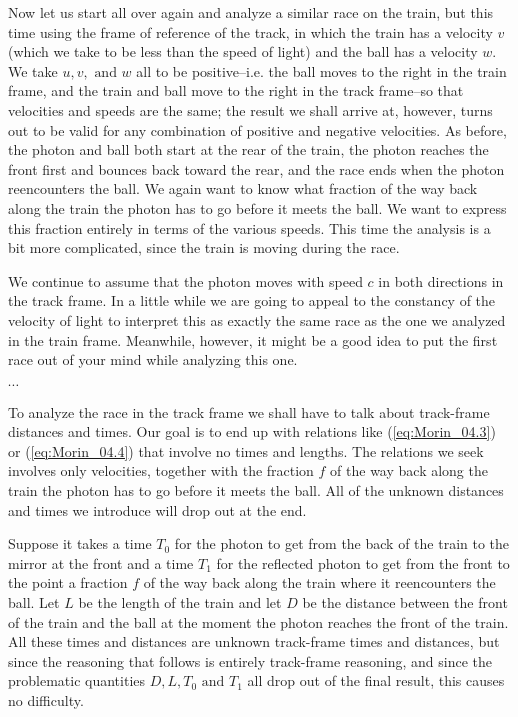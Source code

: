 Now let us start all over again and analyze a similar race on the train, but this time using the frame of reference of the track, in which the train has a velocity $v$ (which we take to be less than the speed of light) and the ball has a velocity $w$. We take $u, v, \text{ and } w$ all to be positive--i.e. the ball moves to the right in the train frame, and the train and ball move to the right in the track frame--so that velocities and speeds are the same; the result we shall arrive at, however, turns out to be valid for any combination of positive and negative velocities. As before, the photon and ball both start at the rear of the train, the photon reaches the front first and bounces back toward the rear, and the race ends when the photon reencounters the ball. We again want to know what fraction of the way back along the train the photon has to go before it meets the ball. We want to express this fraction entirely in terms of the various speeds. This time the analysis is a bit more complicated, since the train is moving during the race.

We continue to assume that the photon moves with speed $c$ in both directions in the track frame. In a little while we are going to appeal to the constancy of the velocity of light to interpret this as exactly the same race as the one we analyzed in the train frame. Meanwhile, however, it might be a good idea to put the first race out of your mind while analyzing this one.  

$\cdots$

To analyze the race in the track frame we shall have to talk about track-frame distances and times. Our goal is to end up with relations like (\ref{eq:Morin_04.3}) or (\ref{eq:Morin_04.4}) that involve no times and lengths. The relations we seek involves only velocities, together with the fraction $f$ of the way back along the train the photon has to go before it meets the ball. All of the unknown distances and times we introduce will drop out at the end. 

Suppose it takes a time $T_0$ for the photon to get from the back of the train to the mirror at the front and a time $T_1$ for the reflected photon to get from the front to the point a fraction $f$ of the way back along the train where it reencounters the ball. Let $L$ be the length of the train and let $D$ be the distance between the front of the train and the ball at the moment the photon reaches the front of the train. All these times and distances are unknown track-frame times and distances, but since the reasoning that follows is entirely track-frame reasoning, and since the problematic quantities 
$D, L, T_0 \text{ and } T_1$ all drop out of the final result, this causes no difficulty. 

